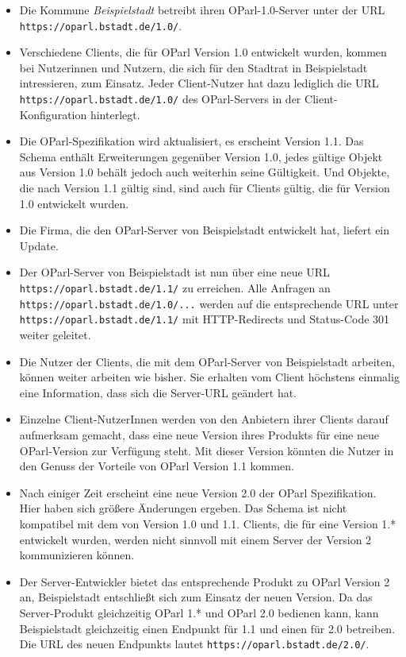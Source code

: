 \documentclass[,a4paper]{article}
\begin{document}
\begin{itemize}
\item
  Die Kommune \emph{Beispielstadt} betreibt ihren OParl-1.0-Server unter
  der URL \texttt{https://oparl.bstadt.de/1.0/}.
\item
  Verschiedene Clients, die für OParl Version 1.0 entwickelt wurden,
  kommen bei Nutzerinnen und Nutzern, die sich für den Stadtrat in
  Beispielstadt intressieren, zum Einsatz. Jeder Client-Nutzer hat dazu
  lediglich die URL \texttt{https://oparl.bstadt.de/1.0/} des
  OParl-Servers in der Client-Konfiguration hinterlegt.
\item
  Die OParl-Spezifikation wird aktualisiert, es erscheint Version 1.1.
  Das Schema enthält Erweiterungen gegenüber Version 1.0, jedes gültige
  Objekt aus Version 1.0 behält jedoch auch weiterhin seine Gültigkeit.
  Und Objekte, die nach Version 1.1 gültig sind, sind auch für Clients
  gültig, die für Version 1.0 entwickelt wurden.
\item
  Die Firma, die den OParl-Server von Beispielstadt entwickelt hat,
  liefert ein Update.
\item
  Der OParl-Server von Beispielstadt ist nun über eine neue URL
  \texttt{https://oparl.bstadt.de/1.1/} zu erreichen. Alle Anfragen an
  \texttt{https://oparl.bstadt.de/1.0/...} werden auf die entsprechende
  URL unter \texttt{https://oparl.bstadt.de/1.1/} mit HTTP-Redirects und
  Status-Code 301 weiter geleitet.
\item
  Die Nutzer der Clients, die mit dem OParl-Server von Beispielstadt
  arbeiten, können weiter arbeiten wie bisher. Sie erhalten vom Client
  höchstens einmalig eine Information, dass sich die Server-URL geändert
  hat.
\item
  Einzelne Client-NutzerInnen werden von den Anbietern ihrer Clients
  darauf aufmerksam gemacht, dass eine neue Version ihres Produkts für
  eine neue OParl-Version zur Verfügung steht. Mit dieser Version
  könnten die Nutzer in den Genuss der Vorteile von OParl Version 1.1
  kommen.
\item
  Nach einiger Zeit erscheint eine neue Version 2.0 der OParl
  Spezifikation. Hier haben sich größere Änderungen ergeben. Das Schema
  ist nicht kompatibel mit dem von Version 1.0 und 1.1. Clients, die für
  eine Version 1.* entwickelt wurden, werden nicht sinnvoll mit einem
  Server der Version 2 kommunizieren können.
\item
  Der Server-Entwickler bietet das entsprechende Produkt zu OParl
  Version 2 an, Beispielstadt entschließt sich zum Einsatz der neuen
  Version. Da das Server-Produkt gleichzeitig OParl 1.* und OParl 2.0
  bedienen kann, kann Beispielstadt gleichzeitig einen Endpunkt für 1.1
  und einen für 2.0 betreiben. Die URL des neuen Endpunkts lautet
  \texttt{https://oparl.bstadt.de/2.0/}.
\end{itemize}
\end{document}
